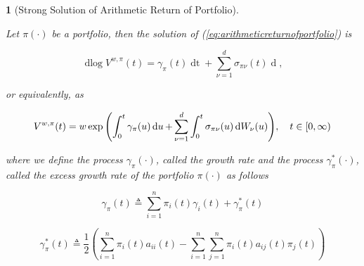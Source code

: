 \documentclass[british]{amsart} \usepackage{lmodern}
\numberwithin{equation}{section} \numberwithin{figure}{section}
\theoremstyle{plain} \newtheorem{thm}{\protect\theoremname}[section]
\theoremstyle{definition} \newtheorem{defn}[thm]{\protect\definitionname}
\theoremstyle{plain} \newtheorem{assumption}[thm]{\protect\assumptionname}
\theoremstyle{plain} \newtheorem{lem}[thm]{\protect\lemmaname}
\theoremstyle{plain} \newtheorem{prop}[thm]{\protect\propositionname}
\theoremstyle{remark} \newtheorem{rem}[thm]{\protect\remarkname}
\theoremstyle{plain} \newtheorem{cor}[thm]{\protect\corollaryname}
\renewcommand{\d}[1]{\mathop{\mathrm{d}{#1}}}
\newcommand{\defeq}{\mathop{\triangleq}} \newcommand{\almostsurely}{\text{a.s.}}
\newcommand{\V}{V^{w,\pi}}
\begin{document}
\begin{prop} [Strong Solution of Arithmetic Return of Portfolio]
  \label{prop:solutionofarithmeticreturnofportfolio}

  Let $\pi(\cdot)$ be a portfolio, then the solution of
  (\ref{eq:arithmeticreturnofportfolio}) is

  \begin{equation}
    \label{eq:solutionofarithmeticreturnofportfoliodiff}
    \d\log{\V(t)} =  
        \gamma_{\pi}(t) \d{t} +
        \sum_{\nu=1}^{d} \sigma_{\pi\nu}(t) \d{W_{\nu}(t)} ,
  \end{equation}

  or equivalently, as

  \begin{equation}
    \label{eq:solutionofarithmeticreturnofportfolio}
    \V(t) = w \exp{ 
      \left(
        \int_{0}^{t} \gamma_{\pi}(u) \d{u} +
        \sum_{\nu=1}^{d} \int_{0}^{t} \sigma_{\pi\nu}(u) \d{W_{\nu}(u)}
      \right)},
  \quad \ranget
  \end{equation}

  where we define the process $\gamma_{\pi}(\cdot)$, called the \textit{growth
  rate} and the process $\gamma_{\pi}^{*}(\cdot)$, called the \textit{excess
  growth rate} of the portfolio $\pi(\cdot)$ as follows

  \begin{equation}
    \label{eq:portfoliogrowthrate}
    \gamma_{\pi}(t) \defeq 
      \sum_{i=1}^{n} \pi_{i}(t)\gamma_{i}(t) + 
      \gamma_{\pi}^{*}(t)
  \end{equation}

  \begin{equation}
    \label{eq:portfolioexcessgrowthrate}
    \gamma_{\pi}^{*}(t) \defeq \frac{1}{2} 
        \left(
          \sum_{i=1}^{n} \pi_{i}(t)a_{ii}(t) -
          \sum_{i=1}^{n} \sum_{j=1}^{n} \pi_{i}(t)a_{ij}(t)\pi_{j}(t)
        \right)
  \end{equation}

\end{prop}
\newcommand{\Valpha}{\V(t)b_{\pi}(t)}
\newcommand{\Vbeta}{\V(t)\sigma_{\pi\nu}(t)}
\newcommand{\VFt}{0}
\newcommand{\VFx}{\frac{1}{\V(t)}}
\newcommand{\VFxx}{-\frac{1}{(\V(t))^2}}
\end{document}
